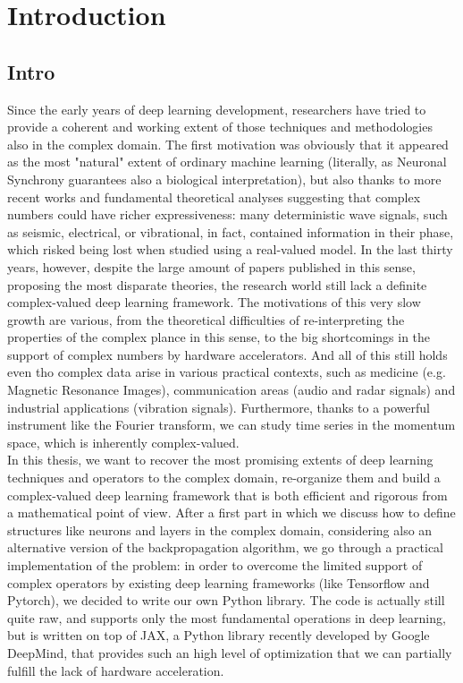 \documentclass[../main.tex]{subfiles}
\begin{document}
\chapter{Introduction}

\section{Intro}
Since the early years of deep learning development, researchers have tried to provide a coherent and working extent of those techniques and methodologies also in the complex domain. The first motivation was obviously that it appeared as the most "natural" extent of ordinary machine learning (literally, as Neuronal Synchrony \cite{reichert2014neuronal} guarantees also a biological interpretation), but also thanks to more recent works and fundamental theoretical analyses suggesting that complex numbers could have richer expressiveness: many deterministic wave signals, such as seismic, electrical, or vibrational, in fact, contained information in their phase, which risked being lost when studied using a real-valued model. In the last thirty years, however, despite the large amount of papers published in this sense, proposing the most disparate theories, the research world still lack a definite complex-valued deep learning framework. The motivations of this very slow growth are various, from the theoretical difficulties of re-interpreting the properties of the complex plance in this sense, to the big shortcomings in the support of complex numbers by hardware accelerators. And all of this still holds even tho complex data arise in various practical contexts, such as medicine (e.g. Magnetic Resonance Images), communication areas (audio and radar signals) and industrial applications (vibration signals). Furthermore, thanks to a powerful instrument like the Fourier transform, we can study time series in the momentum space, which is inherently complex-valued.\\
In this thesis, we want to recover the most promising extents of deep learning techniques and operators to the complex domain, re-organize them and build a complex-valued deep learning framework that is both efficient and rigorous from a mathematical point of view. After a first part in which we discuss how to define structures like neurons and layers in the complex domain,
considering also an alternative version of the backpropagation algorithm, we go through a practical implementation of the problem: in order to overcome the limited support of complex operators by existing deep learning frameworks (like Tensorflow and Pytorch), we decided to write our own Python library. The code is actually still quite raw, and supports only the most fundamental operations in deep learning, but is written on top of JAX, a Python library recently developed by Google DeepMind, that provides such an high level of optimization that we can partially fulfill the lack of hardware acceleration.\\
\end{document}
